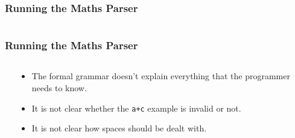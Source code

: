 \begin{frame}[fragile]
\frametitle{Running the Maths Parser}

\begin{columns}[T]

\begin{column}{0.45\textwidth}

\end{column}


\pause
\begin{column}{0.45\textwidth}
\pause
{}
\pause
{}
\end{column}

\end{columns}
\end{frame}



\begin{frame}[fragile]
\frametitle{Running the Maths Parser}

\begin{columns}[T]

\begin{column}{0.45\textwidth}
\pause
{}
\pause
{}
\end{column}

\pause
\begin{column}{0.45\textwidth}
\begin{itemize}[<+->]
\item The formal grammar doesn't explain everything that the
programmer needs to know.
\item It is not clear whether the \verb^a+c^ example is
invalid or not.
\item It is not clear how spaces should be dealt with.
\end{itemize}
\end{column}

\end{columns}
\end{frame}

